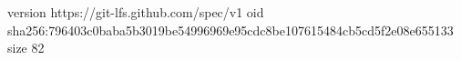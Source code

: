 version https://git-lfs.github.com/spec/v1
oid sha256:796403c0baba5b3019be54996969e95cdc8be107615484cb5cd5f2e08e655133
size 82
